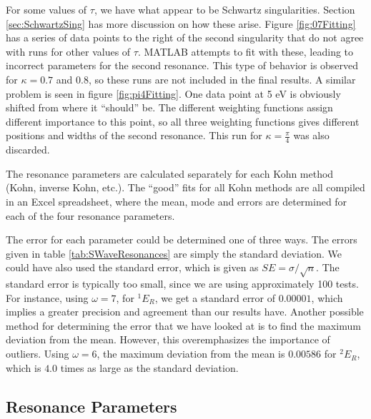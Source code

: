 \documentclass[Dissertation.tex]{subfiles}
\begin{document}
For some values of $\tau$, we have what appear to be Schwartz singularities.  Section \ref{sec:SchwartzSing} has more discussion on how these arise.  Figure \ref{fig:07Fitting} has a series of data points to the right of the second singularity that do not agree with runs for other values of $\tau$.  MATLAB attempts to fit with these, leading to incorrect parameters for the second resonance.  This type of behavior is observed for $\kappa = 0.7$ and $0.8$, so these runs are not included in the final results.  A similar problem is seen in figure \ref{fig:pi4Fitting}.  One data point at 5 eV is obviously shifted from where it ``should'' be.  The different weighting functions assign different importance to this point, so all three weighting functions gives different positions and widths of the second resonance.  This run for $\kappa = \frac{\pi}{4}$ was also discarded. 

The resonance parameters are calculated separately for each Kohn method (Kohn, inverse Kohn, etc.).  The ``good'' fits for all Kohn methods are all compiled in an Excel spreadsheet, where the mean, mode and errors are determined for each of the four resonance parameters.

The error for each parameter could be determined one of three ways.  The errors given in table \ref{tab:SWaveResonances} are simply the standard deviation.  We could have also used the standard error, which is given as $SE = \sigma / \sqrt{n}$.  The standard error is typically too small, since we are using approximately 100 tests.  For instance, using $\omega = 7$, for $^1E_R$, we get a standard error of $0.00001$, which implies a greater precision and agreement than our results have.  Another possible method for determining the error that we have looked at is to find the maximum deviation from the mean.  However, this overemphasizes the importance of outliers.  Using $\omega = 6$, the maximum deviation from the mean is $0.00586$ for $^2E_R$, which is $4.0$ times as large as the standard deviation. 



\subsection{Resonance Parameters}
\end{document}

